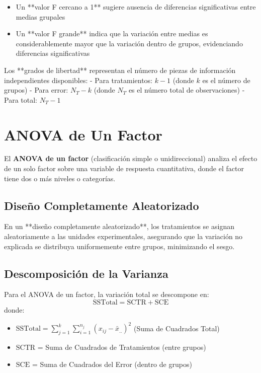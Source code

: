 \begin{theorem}
\begin{itemize}
    \item Un **valor F cercano a 1** sugiere ausencia de diferencias significativas entre medias grupales
    \item Un **valor F grande** indica que la variación entre medias es considerablemente mayor que la variación dentro de grupos, evidenciando diferencias significativas
\end{itemize}
\end{theorem}

Los **grados de libertad** representan el número de piezas de información independientes disponibles:
- Para tratamientos: $k-1$ (donde $k$ es el número de grupos)
- Para error: $N_T-k$ (donde $N_T$ es el número total de observaciones)
- Para total: $N_T-1$

\section{ANOVA de Un Factor}

\begin{definition}
El \textbf{ANOVA de un factor} (clasificación simple o unidireccional) analiza el efecto de un solo factor sobre una variable de respuesta cuantitativa, donde el factor tiene dos o más niveles o categorías.
\end{definition}

\subsection{Diseño Completamente Aleatorizado}

En un **diseño completamente aleatorizado**, los tratamientos se asignan aleatoriamente a las unidades experimentales, asegurando que la variación no explicada se distribuya uniformemente entre grupos, minimizando el sesgo.

\subsection{Descomposición de la Varianza}

\begin{theorem}
Para el ANOVA de un factor, la variación total se descompone en:
\[
\text{SSTotal} = \text{SCTR} + \text{SCE}
\]
donde:
\begin{itemize}
    \item $\text{SSTotal} = \sum_{j=1}^{k} \sum_{i=1}^{n_j} (x_{ij} - \bar{x}_{..})^2$ (Suma de Cuadrados Total)
    \item $\text{SCTR}$ = Suma de Cuadrados de Tratamientos (entre grupos)
    \item $\text{SCE}$ = Suma de Cuadrados del Error (dentro de grupos)
\end{itemize}
\end{theorem}

